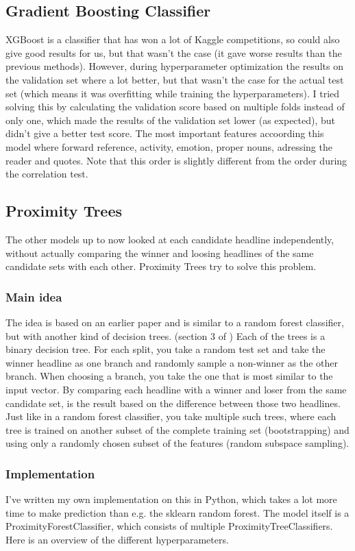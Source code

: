 \documentclass{article}
\begin{document}
 \subsection{Gradient Boosting Classifier}
 XGBoost is a classifier that has won a lot of Kaggle competitions, so could also give good results for us, but that wasn't the case (it gave worse results than the previous methods). However, during hyperparameter optimization the results on the validation set where a lot better, but that wasn't the case for the actual test set (which means it was overfitting while training the hyperparameters). I tried solving this by calculating the validation score based on multiple folds instead of only one, which made the results of the validation set lower (as expected), but didn't give a better test score. The most important features accoording this model where forward reference, activity, emotion, proper nouns, adressing the reader and quotes. Note that this order is slightly different from the order during the correlation test.

 \subsection{Proximity Trees}
 The other models up to now looked at each candidate headline independently, without actually comparing the winner and loosing headlines of the same candidate sets with each other. Proximity Trees try to solve this problem.

 \subsubsection{Main idea}
 The idea is based on an earlier paper and is similar to a random forest classifier, but with another kind of decision trees. (section 3 of \cite{lucas2019proximity}) Each of the trees is a binary decision tree. For each split, you take a random test set and take the winner headline as one branch and randomly sample a non-winner as the other branch. When choosing a branch, you take the one that is most similar to the input vector. By comparing each headline with a winner and loser from the same candidate set, is the result based on the difference between those two headlines. Just like in a random forest classifier, you take multiple such trees, where each tree is trained on another subset of the complete training set (bootstrapping) and using only a randomly chosen subset of the features (random subspace sampling).

 \subsubsection{Implementation}
 I've written my own implementation on this in Python, which takes a lot more time to make prediction than e.g. the sklearn random forest. The model itself is a ProximityForestClassifier, which consists of multiple ProximityTreeClassifiers. Here is an overview of the different hyperparameters.
\end{document}
